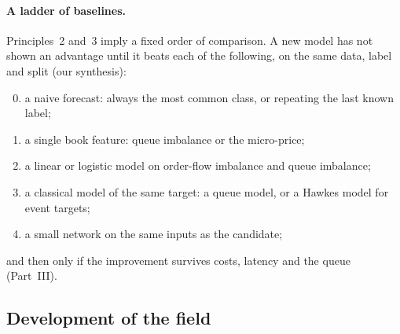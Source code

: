 \paragraph{A ladder of baselines.} Principles~2 and~3 imply a fixed order of comparison. A new model has not shown an
advantage until it beats each of the following, on the same data, label and split (our synthesis):
\begin{enumerate}[leftmargin=1.8em,itemsep=1pt]
\setcounter{enumi}{-1}
\item a naive forecast: always the most common class, or repeating the last known label;
\item a single book feature: queue imbalance or the micro-price;
\item a linear or logistic model on order-flow imbalance and queue imbalance;
\item a classical model of the same target: a queue model, or a Hawkes model for event targets;
\item a small network on the same inputs as the candidate;
\end{enumerate}
and then only if the improvement survives costs, latency and the queue (Part~III).


\subsection{Development of the field}
\label{sec:history}

